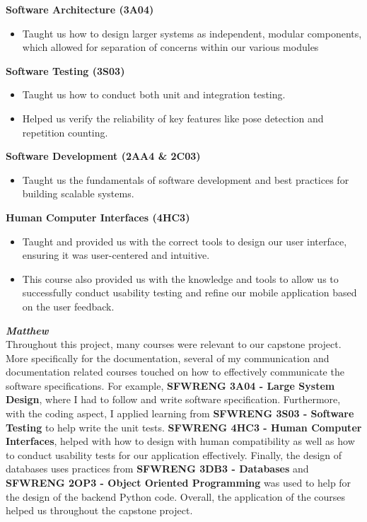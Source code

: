 \documentclass{article}
\begin{document}
\textbf{Software Architecture (3A04)}
\begin{itemize}
    \item Taught us how to design larger systems as independent, modular components, which 
    allowed for separation of concerns within our various modules
\end{itemize}
\textbf{Software Testing (3S03)}
\begin{itemize}
    \item Taught us how to conduct both unit and integration testing.
    \item Helped us verify the reliability of key features like pose detection and repetition counting.
\end{itemize}
\textbf{Software Development (2AA4 \& 2C03)}
\begin{itemize}
    \item Taught us the fundamentals of software development and best practices for building 
    scalable systems.
\end{itemize}
\textbf{Human Computer Interfaces (4HC3)}
\begin{itemize}
    \item Taught and provided us with the correct tools to design our user interface, 
    ensuring it was user-centered and intuitive.
    \item This course also provided us with the knowledge and tools to allow us to 
    successfully conduct usability testing and refine our mobile application based 
    on the user feedback.
\end{itemize}
\textit{\textbf{Matthew}}\\
Throughout this project, many courses were relevant to our capstone project. More specifically for the 
documentation, several of my communication and documentation related courses touched on how to effectively 
communicate the software specifications. For example, \textbf{SFWRENG 3A04 - Large System Design}, 
where I had to follow and write software specification. 
Furthermore, with the coding aspect, I applied learning from \textbf{SFWRENG 3S03 - Software Testing} 
to help write the unit tests. \textbf{SFWRENG 4HC3 - Human Computer Interfaces}, helped with how to 
design with human compatibility as well as how to conduct usability tests for our application
effectively. Finally, the design of databases uses practices from \textbf{SFWRENG 3DB3 - Databases} and 
\textbf{SFWRENG 2OP3 - Object Oriented Programming} was used to help for the design of the backend Python code. 
Overall, the application of the courses helped us throughout the capstone project.
\end{document}
